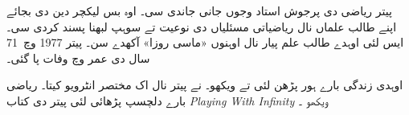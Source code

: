 \documentclass[../../../include/open-logic-section]{subfiles}
\begin{document}
پیتر ریاضی دی پرجوش استاد وجوں جانی جاندی سی۔ اوہ بس لیکچر دین دی بجائے اپنے طالب علماں نال ریاضیاتی مسئلیاں دی نوعیت تے سوہپ لبھنا پسند کردی سی۔ ایس لئی اوہدے طالب علم پیار نال اوہنوں «ماسی روزا» آکھدے سن۔ پیتر 1977 وچ~71 سال دی عمر وچ وفات پا گئی۔

\begin{reading}
اوہدی زندگی بارے ہور پڑھن لئی \citep{Oconnor2014} تے \citep{Andrasfai1986} ویکھو۔ \citet{Tamassy1994} نے پیتر نال اک مختصر انٹرویو کیتا۔ ریاضی بارے دلچسپ پڑھائی لئی پیتر دی کتاب \emph{Playing With Infinity} ویکھو \citep{Peter2010}۔
\end{reading}
\end{document}
